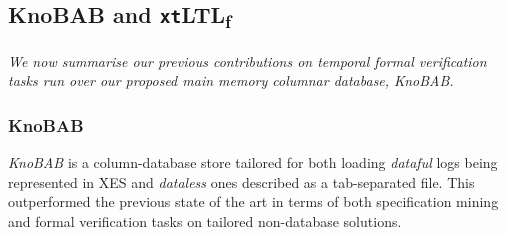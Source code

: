 \documentclass[sigconf]{acmart}
\begin{document}
\subsection{KnoBAB and \texttt{xt}LTL\textsubscript{f}}
\textit{We now summarise our previous contributions on temporal formal verification tasks run over our proposed main memory columnar database, KnoBAB.}
\subsubsection{KnoBAB}
\textit{KnoBAB} \cite{info14030173,computers12090185} is a column-database store tailored for both loading \textit{dataful} logs being represented in XES \cite{DBLP:journals/cim/AcamporaVSAGV17} and \textit{dataless} ones described as a tab-separated file. This outperformed the previous state of the art in terms of both specification mining \cite{APrioriDeclare} and formal verification \cite{BurattinMS16} tasks on tailored non-database solutions.  
\end{document}
